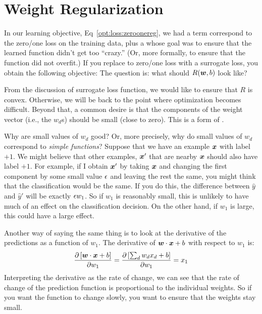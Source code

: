\section{Weight Regularization}

In our learning objective, Eq~\eqref{opt:loss:zeroonereg}, we had a term
correspond to the zero/one loss on the training data, plus a
 whose goal was to ensure that the learned
function didn't get too ``crazy.''  (Or, more formally, to ensure that
the function did not overfit.)  If you replace to zero/one loss with a
surrogate loss, you obtain the following objective:
%
%
The question is: what should $R({\boldsymbol{w}},b)$ look like?

From the discussion of surrogate loss function, we would like to
ensure that $R$ is convex.  Otherwise, we will be back to the point
where optimization becomes difficult.  Beyond that, a common desire is
that the components of the weight vector (i.e., the $w_d$s) should be
small (close to zero).  This is a form of .

Why are small values of $w_d$ good?  Or, more precisely, why do small
values of $w_d$ correspond to \emph{simple functions}?  Suppose that
we have an example ${\boldsymbol{x}}$ with label $+1$.  We might believe that other
examples, ${\boldsymbol{x}}'$ that are nearby ${\boldsymbol{x}}$ should also have label $+1$.
For example, if I obtain ${\boldsymbol{x}}'$ by taking ${\boldsymbol{x}}$ and changing the first
component by some small value $\epsilon$ and leaving the rest the same, you
might think that the classification would be the same.  If you do
this, the difference between $\hat y$ and $\hat y'$ will be exactly
$\epsilon w_1$.  So if $w_1$ is reasonably small, this is unlikely to have
much of an effect on the classification decision.  On the other hand,
if $w_1$ is large, this could have a large effect.

Another way of saying the same thing is to look at the derivative of
the predictions as a function of $w_1$.  The derivative of
${\boldsymbol{w}} \cdot {\boldsymbol{x}}+b$ with respect to $w_1$ is:
\begin{equation}
\frac {\partial \left[{\boldsymbol{w}} \cdot {\boldsymbol{x}}+b\right]} {\partial w_1}
= \frac {\partial \left[\sum_d w_d x_d+b\right]} {\partial w_1}
= x_1
\end{equation}
Interpreting the derivative as the rate of change, we can see that the
rate of change of the prediction function is proportional to the
individual weights.  So if you want the function to change slowly, you
want to ensure that the weights stay small.

